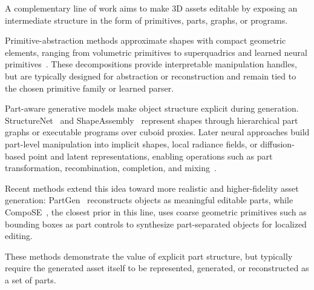 A complementary line of work aims to make 3D assets editable by exposing an intermediate structure in the form of primitives, parts, graphs, or programs. 

Primitive-abstraction methods approximate shapes with compact geometric elements, ranging from volumetric primitives to superquadrics and learned neural primitives~\cite{abstractionTulsiani17,Paschalidou2019CVPR,Paschalidou2021CVPR}. These decompositions provide interpretable manipulation handles, but are typically designed for abstraction or reconstruction and remain tied to the chosen primitive family or learned parser.


Part-aware generative models make object structure explicit during generation. StructureNet~\cite{MoGuerreroEtAl:StructureNet:SiggraphAsia:2019} and ShapeAssembly~\cite{jones2020shapeAssembly} represent shapes through hierarchical part graphs or executable programs over cuboid proxies. Later neural approaches build part-level manipulation into implicit shapes, local radiance fields, or diffusion-based point and latent representations, enabling operations such as part transformation, recombination, completion, and mixing~\cite{hertz2022spaghetti,Tertikas2023CVPR,koo2023salad,nakayama2023difffacto}.

Recent methods extend this idea toward more realistic and higher-fidelity asset generation: PartGen~\cite{Chen2025PartGen} reconstructs objects as meaningful editable parts, while CompoSE~\cite{slim2026composecompositionalsynthesisediting}, the closest prior in this line, uses coarse geometric primitives such as bounding boxes as part controls to synthesize part-separated objects for localized editing.

These methods demonstrate the value of explicit part structure, but typically require the generated asset itself to be represented, generated, or reconstructed as a set of parts.